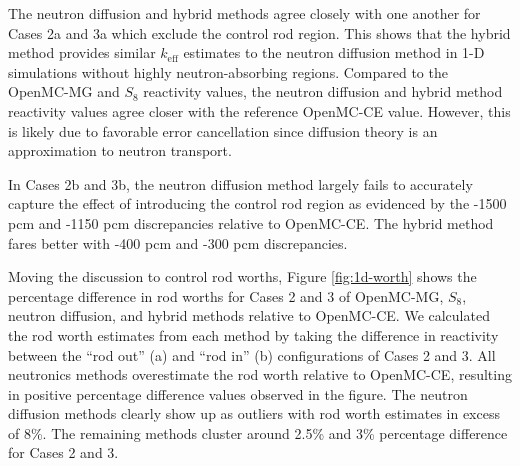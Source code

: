 \documentclass[letterpaper]{mc2025}
\begin{document}
The neutron diffusion and hybrid methods agree closely with one another for Cases 2a and 3a which
exclude the control rod region. This shows that the hybrid method provides similar $k_\text{eff}$
estimates to the neutron diffusion method in 1-D simulations without highly neutron-absorbing
regions. Compared to the OpenMC-MG and $S_8$ reactivity values, the neutron diffusion and hybrid
method reactivity values agree closer with the reference OpenMC-CE value. However, this is likely
due to favorable error cancellation since diffusion theory is an approximation to neutron
transport.

In Cases 2b and 3b, the neutron diffusion method largely fails to accurately capture the
effect of introducing the control rod region as evidenced by the -1500 pcm and -1150 pcm
discrepancies relative to OpenMC-CE. The hybrid method fares better with -400 pcm and -300 pcm
discrepancies.

Moving the discussion to control rod worths, Figure \ref{fig:1d-worth} shows the percentage
difference in rod worths for Cases 2 and 3 of OpenMC-MG, $S_8$, neutron diffusion, and hybrid
methods relative to OpenMC-CE. We calculated the rod worth estimates from each method by taking the
difference in reactivity between the ``rod out'' (a) and ``rod in'' (b) configurations of Cases 2
and 3. All neutronics methods overestimate the rod worth relative to OpenMC-CE, resulting in
positive percentage difference values observed in the figure.
The neutron diffusion methods clearly show up as outliers with rod worth estimates in excess
of 8\%. The remaining methods cluster around 2.5\% and 3\% percentage difference for Cases
2 and 3.
\end{document}
